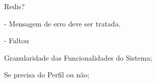 Redis?

- Mensagem de erro deve ser tratada.

- Faltou 

Granularidade das Funcionalidades do Sistema;

Se precisa do Perfil ou não;



